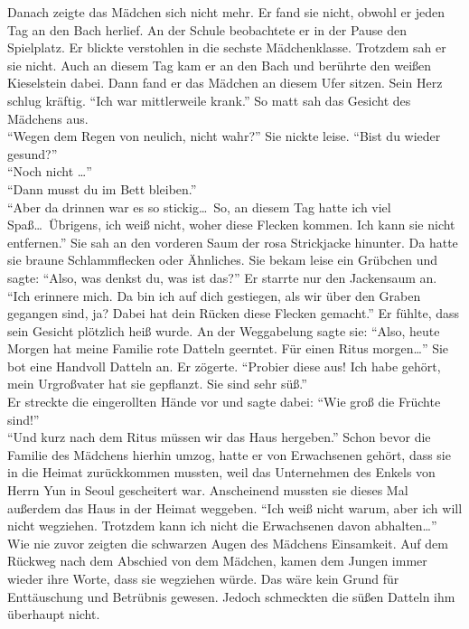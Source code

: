 \documentclass[prd,12pt,tightenlines,notitlepage,nofootinbib]{revtex4-1}
\begin{document}
Danach zeigte das Mädchen sich nicht mehr.
Er fand sie nicht, obwohl er jeden Tag an den Bach herlief.
An der Schule beobachtete er in der Pause den Spielplatz.
Er blickte verstohlen in die sechste Mädchenklasse.
Trotzdem sah er sie nicht.
Auch an diesem Tag kam er an den Bach und berührte
den weißen Kieselstein dabei.
Dann fand er das Mädchen an diesem Ufer sitzen.
Sein Herz schlug kräftig.
"`Ich war mittlerweile krank."'
So matt sah das Gesicht des Mädchens aus.
\\ "`Wegen dem Regen von neulich, nicht wahr?"'
Sie nickte leise.
"`Bist du wieder gesund?"'
\\ "`Noch nicht \ldots"'
\\ "`Dann musst du im Bett bleiben."'
\\ "`Aber da drinnen war es so stickig\ldots\
So, an diesem Tag hatte ich viel Spaß\ldots\
Übrigens, ich weiß nicht, woher diese Flecken kommen.
Ich kann sie nicht entfernen."'
Sie sah an den vorderen Saum der rosa Strickjacke hinunter.
Da hatte sie braune Schlammflecken oder Ähnliches.
Sie bekam leise ein Grübchen und sagte:
"`Also, was denkst du, was ist das?"'
Er starrte nur den Jackensaum an.
"`Ich erinnere mich.
Da bin ich auf dich gestiegen,
als wir über den Graben gegangen sind, ja?
Dabei hat dein Rücken diese Flecken gemacht."'
Er fühlte, dass sein Gesicht plötzlich heiß wurde.
An der Weggabelung sagte sie:
"`Also, heute Morgen hat meine Familie rote Datteln geerntet.
Für einen Ritus morgen\ldots"'
Sie bot eine Handvoll Datteln an.
Er zögerte.
"`Probier diese aus!
Ich habe gehört, mein Urgroßvater hat sie gepflanzt.
Sie sind sehr süß."'
\\ Er streckte die eingerollten Hände vor und sagte dabei:
"`Wie groß die Früchte sind!"'
\\ "`Und kurz nach dem Ritus müssen wir das Haus hergeben."'
Schon bevor die Familie des Mädchens hierhin umzog,
hatte er von Erwachsenen gehört,
dass sie in die Heimat zurückkommen mussten,
weil das Unternehmen des Enkels von Herrn Yun in Seoul gescheitert war.
Anscheinend mussten sie dieses Mal außerdem das Haus in der Heimat weggeben.
"`Ich weiß nicht warum, aber ich will nicht wegziehen.
Trotzdem kann ich nicht die Erwachsenen davon abhalten\ldots"'
Wie nie zuvor zeigten die schwarzen Augen des Mädchens Einsamkeit.
Auf dem Rückweg nach dem Abschied von dem Mädchen,
kamen dem Jungen immer wieder ihre Worte, dass sie wegziehen würde.
Das wäre kein Grund für Enttäuschung und Betrübnis gewesen.
Jedoch schmeckten die süßen Datteln ihm überhaupt nicht.
\end{document}

